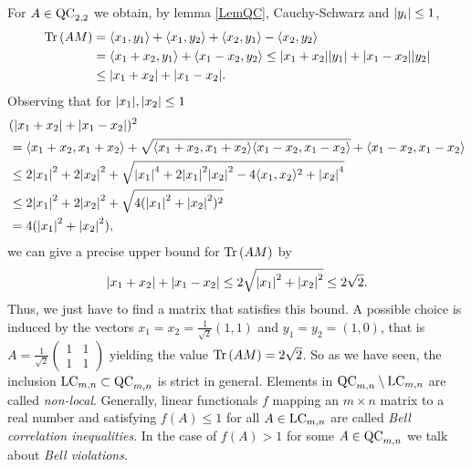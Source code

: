 For $ A \in \textup{QC}_{2,2} $ we obtain, by lemma \ref{LemQC}, Cauchy-Schwarz and $ {\left|{y_i}\right|}\le 1 $,
\begin{align*}
\textup{Tr} \, {(AM)} &= \langle x_1,y_1 \rangle + \langle x_1,y_2 \rangle + \langle x_2,y_1 \rangle - \langle x_2,y_2 \rangle   \\
&= \langle x_1+x_2,y_1 \rangle + \langle x_1-x_2,y_2 \rangle  \le {\left|{x_1+x_2}\right|}{\left|{y_1}\right|} + {\left|{x_1-x_2}\right|}{\left|{y_2}\right|}  \\
&\le {\left|{x_1+x_2}\right|} + {\left|{x_1-x_2}\right|}.
\end{align*} 
Observing that for $ {\left|{x_1}\right|},{\left|{x_2}\right|}\le  1 $
\begin{align*}
&({\left|{x_1+x_2}\right|} + {\left|{x_1-x_2}\right|})^2 \\
&= \langle x_1+x_2,x_1+x_2\rangle  +\sqrt{\langle x_1+x_2,x_1+x_2\rangle  \langle x_1-x_2,x_1-x_2\rangle} +  \langle x_1-x_2,x_1-x_2\rangle  \\
&\le 2{\left|{x_1}\right|}^2+2{\left|{x_2}\right|}^2 + \sqrt{{\left|{x_1}\right|}^4+2{\left|{x_1}\right|}^2{\left|{x_2}\right|}^2-4\langle x_1,x_2\rangle^2+{\left|{x_2}\right|}^4}  \\
&\le  2{\left|{x_1}\right|}^2+2{\left|{x_2}\right|}^2 + \sqrt{4({\left|{x_1}\right|}^2+{\left|{x_2}\right|}^2)^2}  \\
&= 4({\left|{x_1}\right|}^2+{\left|{x_2}\right|}^2),
\end{align*}
we can give a precise upper bound for $ \textup{Tr} \, {(AM)}  $ by 
\begin{align*}
{\left|{x_1+x_2}\right|} + {\left|{x_1-x_2}\right|} \le 2\sqrt{{\left|{x_1}\right|}^2+{\left|{x_2}\right|}^2} \le 2 \sqrt{2}.
\end{align*}
Thus, we just have to find a matrix that satisfies this bound. A possible choice is induced by the vectors $ x_1 = x_2 = \frac{1}{\sqrt{2}}(1,1) $ and $ y_1 = y_2 =(1,0) $, that is $ A = \frac{1}{\sqrt{2}}\begin{pmatrix}
1 & 1 \\ 1 & 1 
\end{pmatrix} $ yielding the value $ \textup{Tr} \, {(AM)}  = 2 \sqrt{2} $.
So as we have seen, the inclusion $ \textup{LC}_{m,n} \subset \textup{QC}_{m,n} $ is strict in general. Elements in $ \textup{QC}_{m,n} \setminus \textup{LC}_{m,n} $ are called {\itshape non-local}.
Generally, linear functionals $ f$ mapping an $ m \times n $ matrix to a real number and satisfying $ f(A) \le 1 $ for all $ A \in \textup{LC}_{m,n} $ are called {\itshape Bell correlation inequalities}. In the case of $ f(A) > 1 $ for some $ A \in \textup{QC}_{m,n} $ we talk about {\itshape Bell violations}. 